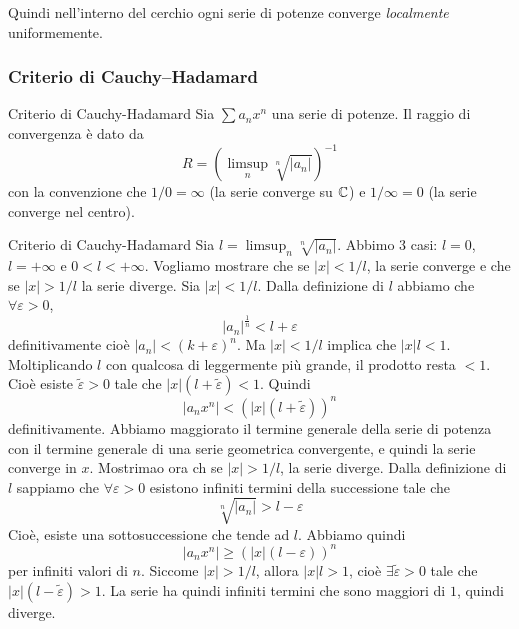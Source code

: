 \documentclass[a4paper]{article}
\begin{document}
\begin{radioactive}
Quindi nell'interno del cerchio ogni serie di potenze converge \emph{localmente} uniformemente.
\end{radioactive}

\subsubsection{Criterio di Cauchy--Hadamard}

\begin{radioactive}
\begin{snippettheorem}{Criterio di Cauchy-Hadamard}
    Sia \(\sum a_n x^n\) una serie di potenze.
    Il raggio di convergenza è dato da
    \[
        R = \left(
            \limsup_n \sqrt[n]{|a_n|}
        \right)^{-1}
    \]
    con la convenzione che \(1/0 = \infty\) (la serie converge su \(\mathbb{C}\))
    e \(1/\infty = 0\) (la serie converge nel centro).
\end{snippettheorem}
\end{radioactive}

\begin{radioactive}
\begin{snippetproof}{Criterio di Cauchy-Hadamard}
    Sia \(l = \limsup_n \sqrt[n]{|a_n|}\).
    Abbimo 3 casi: \(l = 0\), \(l = +\infty\) e \(0 < l < +\infty\).
    Vogliamo mostrare che se \(|x| < 1/l\),
    la serie converge e che se \(|x| > 1/l\) la serie diverge.
    Sia \(|x| < 1/l\).
    Dalla definizione di \(l\) abbiamo che \(\forall \varepsilon > 0\),
    \[
        |a_n|^{\frac1n} < l+\varepsilon
    \]
    definitivamente cioè \(|a_n| < (k+\varepsilon)^n\).
    Ma \(|x| < 1/l\) implica che \(|x|l < 1\).
    Moltiplicando \(l\) con qualcosa di leggermente più grande, il prodotto resta
    \(< 1\). Cioè esiste \(\tilde \varepsilon > 0\)
    tale che \(|x|(l + \tilde \varepsilon) < 1\).
    Quindi \[
        |a_nx^n| < (|x|(l + \tilde \varepsilon))^n
    \]
    definitivamente. Abbiamo maggiorato il termine generale della serie di potenza
    con il termine generale di una serie geometrica convergente, e quindi la serie converge in \(x\).
    Mostrimao ora ch se \(|x| > 1/l\), la serie diverge.
    Dalla definizione di \(l\) sappiamo che \(\forall \varepsilon > 0\)
    esistono infiniti termini della successione tale che
    \[
        \sqrt[n]{|a_n|} > l-\varepsilon
    \]
    Cioè, esiste una sottosuccessione che tende ad \(l\).
    Abbiamo quindi
    \[
        |a_nx^n| \geq (|x|(l - \varepsilon))^n
    \]
    per infiniti valori di \(n\).
    Siccome \(|x|>1/l\), allora \(|x|l>1\), cioè \(\exists \tilde \varepsilon > 0\)
    tale che \(|x|(l-\tilde \varepsilon) > 1\).
    La serie ha quindi infiniti termini che sono maggiori di \(1\), quindi diverge.
\end{snippetproof}
\end{radioactive}
\end{document}
